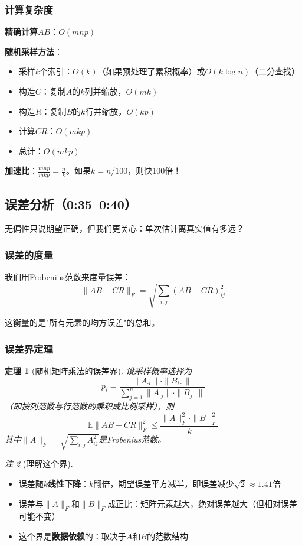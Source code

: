 \documentclass[11pt,a4paper]{ctexart}
\newtheorem{theorem}{定理}[section]
\theoremstyle{definition}
\theoremstyle{remark}
\newtheorem{remark}[theorem]{注}
\begin{document}
\subsubsection{计算复杂度}

\textbf{精确计算}$AB$：$O(mnp)$

\textbf{随机采样方法}：
\begin{itemize}
    \item 采样$k$个索引：$O(k)$（如果预处理了累积概率）或$O(k \log n)$（二分查找）
    \item 构造$C$：复制$A$的$k$列并缩放，$O(mk)$
    \item 构造$R$：复制$B$的$k$行并缩放，$O(kp)$
    \item 计算$CR$：$O(mkp)$
    \item 总计：$O(mkp)$
\end{itemize}

\textbf{加速比}：$\frac{mnp}{mkp} = \frac{n}{k}$。如果$k = n/100$，则快100倍！


\subsection{误差分析（0:35--0:40）}

无偏性只说期望正确，但我们更关心：单次估计离真实值有多远？

\subsubsection{误差的度量}

我们用Frobenius范数来度量误差：
\[
\|AB - CR\|_F = \sqrt{\sum_{i,j} (AB - CR)_{ij}^2}
\]

这衡量的是"所有元素的均方误差"的总和。

\subsubsection{误差界定理}

\begin{theorem}[随机矩阵乘法的误差界]
设采样概率选择为
\[
p_i = \frac{\|A_{\cdot i}\| \cdot \|B_{i \cdot}\|}{\sum_{j=1}^n \|A_{\cdot j}\| \cdot \|B_{j \cdot}\|}
\]
（即按列范数与行范数的乘积成比例采样），则
\[
\mathbb{E}\|AB - CR\|_F^2 \leq \frac{\|A\|_F^2 \cdot \|B\|_F^2}{k}
\]
其中$\|A\|_F = \sqrt{\sum_{i,j} A_{ij}^2}$是Frobenius范数。
\end{theorem}

\begin{remark}[理解这个界]
\begin{itemize}
    \item 误差随$k$\textbf{线性下降}：$k$翻倍，期望误差平方减半，即误差减少$\sqrt{2} \approx 1.41$倍
    \item 误差与$\|A\|_F$和$\|B\|_F$成正比：矩阵元素越大，绝对误差越大（但相对误差可能不变）
    \item 这个界是\textbf{数据依赖}的：取决于$A$和$B$的范数结构
\end{itemize}
\end{remark}
\end{document}
